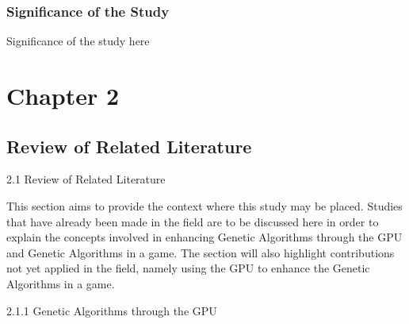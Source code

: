 \documentclass[letterpaper,10pt,titlepage]{article}
\begin{document}
\subsubsection*{Significance of the Study}
Significance of the study here



\section*{Chapter 2}
\subsection*{Review of Related Literature}
2.1 	Review of Related Literature

	This section aims to provide the context where this study may be placed. 
	Studies that have already been made in the field are to be discussed here in order to 
	explain the concepts involved in enhancing Genetic Algorithms through the GPU and 
	Genetic Algorithms in a game. The section will also highlight contributions not yet 
	applied in the field, namely using the GPU to enhance the Genetic Algorithms in a game.

2.1.1   Genetic Algorithms through the GPU
\end{document}

